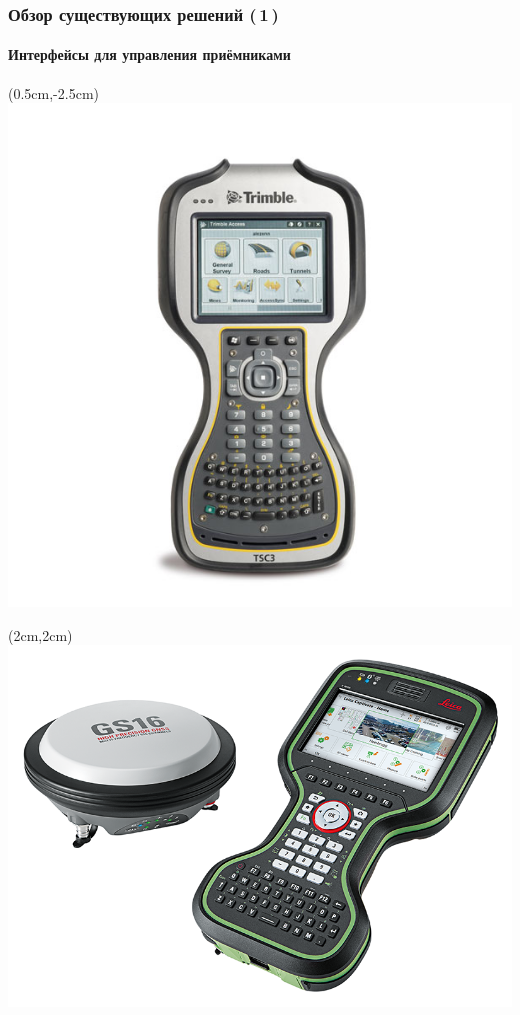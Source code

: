 \documentclass[xetex,с,aspectratio=169]{beamer}
\begin{document}
%
%
\begin{frame}
  \frametitle{Обзор существующих решений (\,1\,)}
  \framesubtitle{Интерфейсы для управления приёмниками}

  \begin{textblock*}{3cm}(0.5cm,-2.5cm)
    \includegraphics[width=\textwidth]{../img/trimble-tsc3}
  \end{textblock*}
  \begin{textblock*}{3cm}(2cm,2cm)
    \includegraphics[width=\textwidth]{../img/leica-gs16}

\end{textblock*}
\end{frame}
\end{document}
